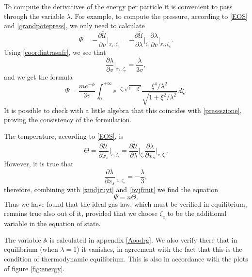 \documentclass[useAMS,usenatbib,prd,twocolumn,nofootinbib]{revtex4-1}
\begin{document}
To compute the derivatives of the energy per particle it is convenient to pass through the variable $\lambda$. For example, to compute the pressure, according to \eqref{EOS} and \eqref{grandpotepress}, we only need to calculate
\begin{equation}\label{xmdjruyt}
\Psi = - \dfrac{\partial \tilde{\mathcal{U}}}{\partial v} \bigg|_{x_s,\zeta_c} =  - \dfrac{\partial \tilde{\mathcal{U}}}{\partial \lambda} \bigg|_{\zeta_c} \dfrac{\partial \lambda}{\partial v} \bigg|_{x_s,\zeta_c} .
\end{equation}
Using \eqref{coordintrasnfr}, we see that
\begin{equation}\label{bvjfirut}
\dfrac{\partial \lambda}{\partial v} \bigg|_{x_s,\zeta_c} =  \dfrac{\lambda}{3v} ,
\end{equation}
and we get the formula
\begin{equation}
\Psi = \dfrac{m e^{-\phi}}{3v}  \int_0^{+\infty}  e^{-\zeta_c \sqrt{1+\xi^2}}   \dfrac{\xi^4/\lambda^2}{\sqrt{1+ \xi^2/\lambda^2  }} \, d\xi .
\end{equation}
It is possible to check with a little algebra that this coincides with \eqref{pressszione}, proving the consistency of the formulation.

The temperature, according to \eqref{EOS}, is
\begin{equation}
\Theta =  \dfrac{\partial \tilde{\mathcal{U}}}{\partial x_s} \bigg|_{v,\zeta_c} =   \dfrac{\partial \tilde{\mathcal{U}}}{\partial \lambda} \bigg|_{\zeta_c} \dfrac{\partial \lambda}{\partial x_s} \bigg|_{v,\zeta_c} .
\end{equation}
However, it is true that
\begin{equation}
\dfrac{\partial \lambda}{\partial x_s} \bigg|_{v,\zeta_c} = -\dfrac{\lambda}{3},
\end{equation}
therefore, combining with \eqref{xmdjruyt} and \eqref{bvjfirut} we find the equation
\begin{equation}
\Psi = n \Theta .
\label{idealgaslawww}
\end{equation}
Thus we have found that the ideal gas law, which must be verified in equilibrium, remains true also out of it, provided that we choose $\zeta_c$ to be the additional variable in the equation of state.

The variable $\mathbb{A}$ is calculated in appendix \ref{Aoadrg}. We also verify there that in equilibrium (when $\lambda=1$) it vanishes, in agreement with the fact that this is the condition of thermodynamic equilibrium. This is also in accordance with the plots of figure \ref{fig:energy}.
\end{document}
